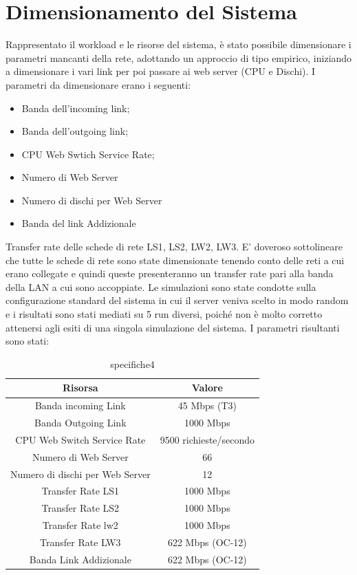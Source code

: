 \section{Dimensionamento del Sistema}
Rappresentato il workload e le risorse del sistema, è stato possibile dimensionare i parametri mancanti della rete, adottando un approccio di tipo empirico, iniziando a dimensionare i vari link per poi passare ai web server (CPU e Dischi). 
I parametri da dimensionare erano i seguenti:
\begin{itemize}
	\item Banda dell'incoming link;
	\item Banda dell'outgoing link;
	\item CPU Web Swtich Service Rate;
	\item Numero di Web Server
	\item Numero di dischi per Web Server
	\item Banda del link Addizionale
\end{itemize}
Transfer rate delle schede di rete LS1, LS2, LW2, LW3.
E' doveroso sottolineare che tutte le schede di rete sono state dimensionate tenendo conto delle reti a cui erano collegate e quindi queste presenteranno un transfer rate pari alla banda della LAN a cui sono accoppiate. Le simulazioni sono state condotte sulla configurazione standard del sistema in cui il server veniva scelto in modo random e  i risultati sono stati mediati su 5 run diversi, poiché non è molto corretto attenersi agli esiti di una singola simulazione del sistema. I parametri risultanti sono stati:
\begin{table}[H]
\begin{center}
\begin{tabular}{||c|c||}
\hline
Risorsa							&Valore\\
\hline
Banda incoming Link				&45 Mbps (T3)\\
\hline	
Banda Outgoing Link				&1000 Mbps\\
\hline
CPU Web Switch Service Rate		&9500 richieste/secondo\\
\hline
Numero di Web Server			&66\\
\hline
Numero di dischi per Web Server	&12\\
\hline
Transfer Rate LS1				&1000 Mbps\\
\hline
Transfer Rate LS2				&1000 Mbps\\
\hline
Transfer Rate lw2		&1000 Mbps\\
\hline
Transfer Rate LW3		&622 Mbps (OC-12)\\
\hline
Banda Link Addizionale	&622 Mbps (OC-12)\\
\hline
\end{tabular}
\end{center}
\caption{specifiche4}
\label{test_4}
\end{table}

